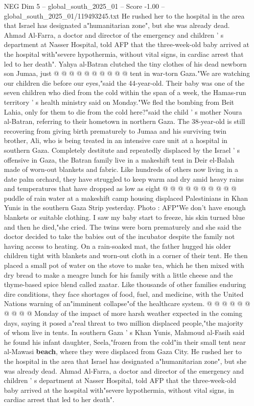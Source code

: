 \begin{textsample}{NEG Dim 5 – global\_south\_2025\_01 – Score -1.00 – global\_south\_2025\_01/119493245.txt}
He rushed her to the hospital in the area that Israel has designated a"humanitarian zone", but she was already dead.
Ahmad Al-Farra, a doctor and director of the emergency and children ' s department at Nasser Hospital, told AFP that the three-week-old baby arrived at the hospital with"severe hypothermia, without vital signs, in cardiac arrest that led to her death".
Yahya al-Batran clutched the tiny clothes of his dead newborn son Jumaa, just @ @ @ @ @ @ @ @ @ @ tent in war-torn Gaza."We are watching our children die before our eyes,"said the 44-year-old.
Their baby was one of the seven children who died from the cold within the span of a week, the Hamas-run territory ' s health ministry said on Monday."We fled the bombing from Beit Lahia, only for them to die from the cold here?"said the child ' s mother Noura al-Batran, referring to their hometown in northern Gaza.
The 38-year-old is still recovering from giving birth prematurely to Jumaa and his surviving twin brother, Ali, who is being treated in an intensive care unit at a hospital in southern Gaza.
Completely destitute and repeatedly displaced by the Israel ' s offensive in Gaza, the Batran family live in a makeshift tent in Deir el-Balah made of worn-out blankets and fabric.
Like hundreds of others now living in a date palm orchard, they have struggled to keep warm and dry amid heavy rains and temperatures that have dropped as low as eight @ @ @ @ @ @ @ @ @ @ puddle of rain water at a makeshift camp housing displaced Palestinians in Khan Yunis in the southern Gaza Strip yesterday.
Photo : AFP"We don't have enough blankets or suitable clothing.
I saw my baby start to freeze, his skin turned blue and then he died,"she cried.
The twins were born prematurely and she said the doctor decided to take the babies out of the incubator despite the family not having access to heating.
On a rain-soaked mat, the father hugged his older children tight with blankets and worn-out cloth in a corner of their tent.
He then placed a small pot of water on the stove to make tea, which he then mixed with dry bread to make a meagre lunch for his family with a little cheese and the thyme-based spice blend called zaatar.
Like thousands of other families enduring dire conditions, they face shortages of food, fuel, and medicine, with the United Nations warning of an"imminent collapse"of the healthcare system. @ @ @ @ @ @ @ @ @ @ Monday of the impact of more harsh weather expected in the coming days, saying it posed a"real threat to two million displaced people,"the majority of whom live in tents.
In southern Gaza ' s Khan Yunis, Mahmoud al-Fasih said he found his infant daughter, Seela,"frozen from the cold"in their small tent near al-Mawasi \textbf{beach}, where they were displaced from Gaza City.
He rushed her to the hospital in the area that Israel has designated a"humanitarian zone", but she was already dead.
Ahmad Al-Farra, a doctor and director of the emergency and children ' s department at Nasser Hospital, told AFP that the three-week-old baby arrived at the hospital with"severe hypothermia, without vital signs, in cardiac arrest that led to her death".

\end{textsample}
